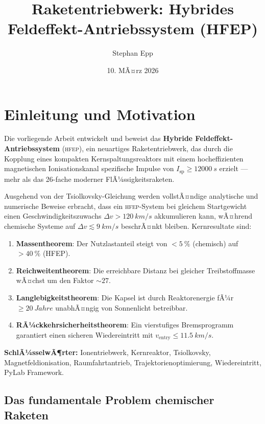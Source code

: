 ﻿\documentclass[a4paper,12pt,twoside]{article}
\title{\textbf{Raketentriebwerk: Hybrides Feldeffekt-Antriebssystem (HFEP)}}
\author{Stephan Epp}
\date{10. MÃ¤rz 2026}
\theoremstyle{plain}
\theoremstyle{definition}
\theoremstyle{remark}
\newcommand{\Isp}{I_{\mathrm{sp}}}
\newcommand{\Dv}{\Delta v}
\newcommand{\HFEP}{\textsc{hfep}}
\begin{document}
	
	\maketitle
	
	\tableofcontents
	\newpage
	
	\section{Einleitung und Motivation}
	\label{sec:intro}
	Die vorliegende Arbeit entwickelt und beweist das \textbf{Hybride Feldeffekt-Antriebssystem}
	(\HFEP), ein neuartiges Raketentriebwerk, das durch die Kopplung eines kompakten
	Kernspaltungsreaktors mit einem hocheffizienten magnetischen Ionisationskanal
	spezifische Impulse von $\Isp \geq \SI{12000}{s}$ erzielt --- mehr als das 26-fache
	moderner FlÃ¼ssigkeitsraketen.
	
	Ausgehend von der Tsiolkovsky-Gleichung werden vollstÃ¤ndige analytische und numerische
	Beweise erbracht, dass ein \HFEP-System bei gleichem Startgewicht einen
	Geschwindigkeitszuwachs $\Dv > \SI{120}{km/s}$ akkumulieren kann, wÃ¤hrend chemische
	Systeme auf $\Dv \lesssim \SI{9}{km/s}$ beschrÃ¤nkt bleiben.
	Kernresultate sind:
	
	\begin{enumerate}
		\item \textbf{Massentheorem}: Der Nutzlastanteil steigt von $<\SI{5}{\%}$
		(chemisch) auf $>\SI{40}{\%}$ (HFEP).
		\item \textbf{Reichweitentheorem}: Die erreichbare Distanz bei gleicher
		Treibstoffmasse wÃ¤chst um den Faktor $\sim 27$.
		\item \textbf{Langlebigkeitstheorem}: Die Kapsel ist durch Reaktorenergie
		fÃ¼r $\geq \SI{20}{Jahre}$ unabhÃ¤ngig von Sonnenlicht betreibbar.
		\item \textbf{RÃ¼ckkehrsicherheitstheorem}: Ein vierstufiges
		Bremsprogramm garantiert einen sicheren Wiedereintritt mit
		$v_{\mathrm{entry}} \leq \SI{11.5}{km/s}$.
	\end{enumerate}
	
	\noindent\textbf{SchlÃ¼sselwÃ¶rter:}
	Ionentriebwerk, Kernreaktor, Tsiolkovsky, Magnetfeldionisation, Raumfahrtantrieb,
	Trajektorienoptimierung, Wiedereintritt, PyLab Framework.
	
	\subsection{Das fundamentale Problem chemischer Raketen}
	
\end{document}
